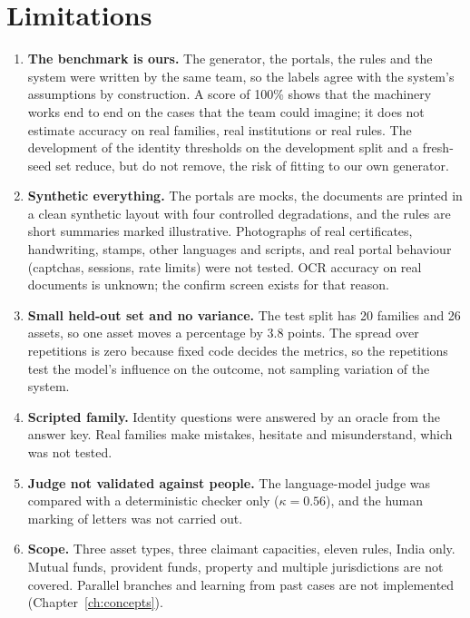 \documentclass[12pt,a4paper,oneside]{report}
\begin{document}
\section{Limitations}
\begin{enumerate}[leftmargin=*,itemsep=3pt]
\item \textbf{The benchmark is ours.} The generator, the portals, the rules and the system were written by the same team, so the labels agree with the system's assumptions by construction. A score of 100\% shows that the machinery works end to end on the cases that the team could imagine; it does not estimate accuracy on real families, real institutions or real rules. The development of the identity thresholds on the development split and a fresh-seed set reduce, but do not remove, the risk of fitting to our own generator.
\item \textbf{Synthetic everything.} The portals are mocks, the documents are printed in a clean synthetic layout with four controlled degradations, and the rules are short summaries marked illustrative. Photographs of real certificates, handwriting, stamps, other languages and scripts, and real portal behaviour (captchas, sessions, rate limits) were not tested. OCR accuracy on real documents is unknown; the confirm screen exists for that reason.
\item \textbf{Small held-out set and no variance.} The test split has 20 families and 26 assets, so one asset moves a percentage by 3.8 points. The spread over repetitions is zero because fixed code decides the metrics, so the repetitions test the model's influence on the outcome, not sampling variation of the system.
\item \textbf{Scripted family.} Identity questions were answered by an oracle from the answer key. Real families make mistakes, hesitate and misunderstand, which was not tested.
\item \textbf{Judge not validated against people.} The language-model judge was compared with a deterministic checker only ($\kappa=0.56$), and the human marking of letters was not carried out.
\item \textbf{Scope.} Three asset types, three claimant capacities, eleven rules, India only. Mutual funds, provident funds, property and multiple jurisdictions are not covered. Parallel branches and learning from past cases are not implemented (Chapter~\ref{ch:concepts}).
\end{enumerate}
\end{document}
